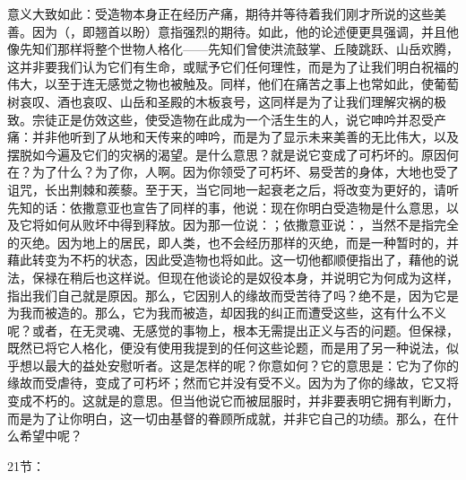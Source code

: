 意义大致如此：受造物本身正在经历产痛，期待并等待着我们刚才所说的这些美善。因为（，即翘首以盼）意指强烈的期待。如此，他的论述便更具强调，并且他像先知们那样将整个世物人格化——先知们曾使洪流鼓掌、丘陵跳跃、山岳欢腾，这并非要我们认为它们有生命，或赋予它们任何理性，而是为了让我们明白祝福的伟大，以至于连无感觉之物也被触及。同样，他们在痛苦之事上也常如此，使葡萄树哀叹、酒也哀叹、山岳和圣殿的木板哀号，这同样是为了让我们理解灾祸的极致。宗徒正是仿效这些，使受造物在此成为一个活生生的人，说它呻吟并忍受产痛：并非他听到了从地和天传来的呻吟，而是为了显示未来美善的无比伟大，以及摆脱如今遍及它们的灾祸的渴望。是什么意思？就是说它变成了可朽坏的。原因何在？为了什么？为了你，人啊。因为你领受了可朽坏、易受苦的身体，大地也受了诅咒，长出荆棘和蒺藜。至于天，当它同地一起衰老之后，将改变为更好的，请听先知的话：依撒意亚也宣告了同样的事，他说：现在你明白受造物是什么意思，以及它将如何从败坏中得到释放。因为那一位说：；依撒意亚说：，当然不是指完全的灭绝。因为地上的居民，即人类，也不会经历那样的灭绝，而是一种暂时的，并藉此转变为不朽的状态，因此受造物也将如此。这一切他都顺便指出了，藉他的说法，保禄在稍后也这样说。但现在他谈论的是奴役本身，并说明它为何成为这样，指出我们自己就是原因。那么，它因别人的缘故而受苦待了吗？绝不是，因为它是为我而被造的。那么，它为我而被造，却因我的纠正而遭受这些，这有什么不义呢？或者，在无灵魂、无感觉的事物上，根本无需提出正义与否的问题。但保禄，既然已将它人格化，便没有使用我提到的任何这些论题，而是用了另一种说法，似乎想以最大的益处安慰听者。这是怎样的呢？你意如何？它的意思是：它为了你的缘故而受虐待，变成了可朽坏；然而它并没有受不义。因为为了你的缘故，它又将变成不朽的。这就是的意思。但当他说它而被屈服时，并非要表明它拥有判断力，而是为了让你明白，这一切由基督的眷顾所成就，并非它自己的功绩。那么，在什么希望中呢？\par

21节：\par

